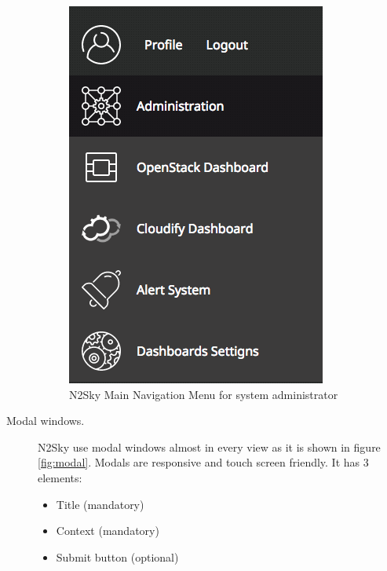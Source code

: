 \begin{description}
 \begin{figure}[H]
\begin{center}
  \includegraphics[scale=0.5]{components/3/components/menu_admin.png}
  \caption{N2Sky Main Navigation Menu for system administrator}
  \label{fig:menu_admin}
\end{center}
\end{figure}

\item[Modal windows.] N2Sky use modal windows almost in every view as it is shown in figure \ref{fig:modal}. Modals are responsive and touch screen friendly. It has 3 elements:
\begin{itemize}
\item Title (mandatory)
\item Context (mandatory)
\item Submit button (optional)
\end{itemize}


\end{description}
